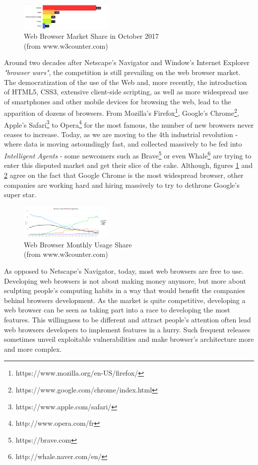 \documentclass[journal]{IEEEtran}
\begin{document}
\begin{figure}[h]
\includegraphics[width=0.4\textwidth]{images/WebBrowserMarketShare.png}
\caption{Web Browser Market Share in October 2017 \\ (from www.w3counter.com)}
\label{fig:marketShare}
\end{figure}

Around two decades after Netscape's Navigator and Window's Internet Explorer \emph{"browser wars"}, the competition is still prevailing on the web browser market. The democratization of the use of the Web and, more recently, the introduction of HTML5, CSS3, extensive client-side scripting, as well as more widespread use of smartphones and other mobile devices for browsing the web, lead to the apparition of dozens of browsers. From Mozilla's Firefox\footnote{https://www.mozilla.org/en-US/firefox/}, Google's Chrome\footnote{https://www.google.com/chrome/index.html}, Apple's Safari\footnote{https://www.apple.com/safari/} to Opera\footnote{http://www.opera.com/fr} for the most famous, the number of new browsers never ceases to increase. Today, as we are moving to the 4th industrial revolution - where data is moving astoundingly fast, and collected massively to be fed into \emph{Intelligent Agents} - some newcomers such as Brave\footnote{https://brave.com} or even Whale\footnote{http://whale.naver.com/en/} are trying to enter this disputed market and get their slice of the cake.
Although, figures \ref{fig:marketShare} and \ref{fig:monthlyUsage} agree on the fact that Google Chrome is the most widespread browser, other companies are working hard and hiring massively to try to dethrone Google's super star.

\begin{figure}[h]
\centering
\includegraphics[width=0.4\textwidth]{images/BrowserFamilyMonthlyUsageShare.png}
\caption{Web Browser Monthly Usage Share \\ (from www.w3counter.com)}
\label{fig:monthlyUsage}
\end{figure}


As opposed to Netscape's Navigator, today, most web browsers are free to use. Developing web browsers is not about making money anymore, but more about sculpting people's computing habits in a way that would benefit the companies behind browsers development.
As the market is quite competitive, developing a web browser can be seen as taking part into a race to developing the most features. This willingness to be different and attract people's attention often lead web browsers developers to implement features in a hurry. Such frequent releases sometimes unveil exploitable vulnerabilities and make browser's architecture more and more complex.
\end{document}
